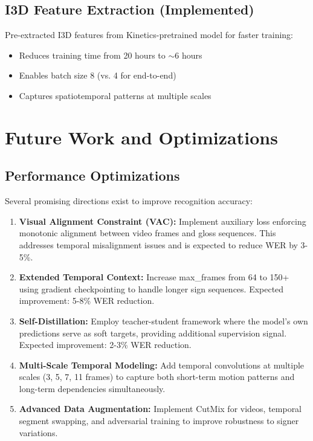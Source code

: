 \documentclass[12pt,a4paper]{article}
\begin{document}
\subsection{I3D Feature Extraction (Implemented)}

Pre-extracted I3D features from Kinetics-pretrained model for faster training:
\begin{itemize}[noitemsep]
    \item Reduces training time from 20 hours to $\sim$6 hours
    \item Enables batch size 8 (vs. 4 for end-to-end)
    \item Captures spatiotemporal patterns at multiple scales
\end{itemize}

\section{Future Work and Optimizations}

\subsection{Performance Optimizations}

Several promising directions exist to improve recognition accuracy:

\begin{enumerate}[noitemsep]
    \item \textbf{Visual Alignment Constraint (VAC):} Implement auxiliary loss enforcing monotonic alignment between video frames and gloss sequences. This addresses temporal misalignment issues and is expected to reduce WER by 3-5\%.
    
    \item \textbf{Extended Temporal Context:} Increase max\_frames from 64 to 150+ using gradient checkpointing to handle longer sign sequences. Expected improvement: 5-8\% WER reduction.
    
    \item \textbf{Self-Distillation:} Employ teacher-student framework where the model's own predictions serve as soft targets, providing additional supervision signal. Expected improvement: 2-3\% WER reduction.
    
    \item \textbf{Multi-Scale Temporal Modeling:} Add temporal convolutions at multiple scales (3, 5, 7, 11 frames) to capture both short-term motion patterns and long-term dependencies simultaneously.
    
    \item \textbf{Advanced Data Augmentation:} Implement CutMix for videos, temporal segment swapping, and adversarial training to improve robustness to signer variations.
\end{enumerate}
\end{document}
